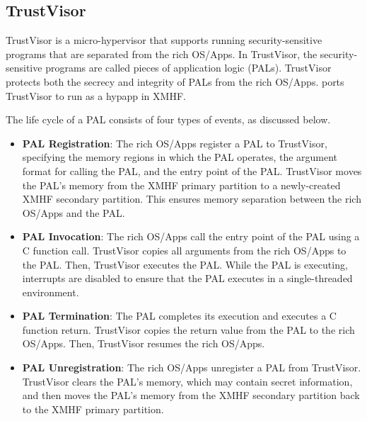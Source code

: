 \subsection{TrustVisor}
\label{sec:bg_tv}

TrustVisor \cite{mccune2010trustvisor} is a micro-hypervisor that supports running security-sensitive programs that are separated from the rich OS/Apps. In TrustVisor, the security-sensitive programs are called pieces of application logic (PALs). TrustVisor protects both the secrecy and integrity of PALs from the rich OS/Apps. \cite{vasudevan2013design} ports TrustVisor to run as a hypapp in XMHF.

The life cycle of a PAL consists of four types of events, as discussed below.

\begin{itemize}
\item \textbf{PAL Registration}: The rich OS/Apps register a PAL to TrustVisor, specifying the memory regions in which the PAL operates, the argument format for calling the PAL, and the entry point of the PAL. TrustVisor moves the PAL's memory from the XMHF primary partition to a newly-created XMHF secondary partition. This ensures memory separation between the rich OS/Apps and the PAL.

\item \textbf{PAL Invocation}: The rich OS/Apps call the entry point of the PAL using a C function call. TrustVisor copies all arguments from the rich OS/Apps to the PAL. Then, TrustVisor executes the PAL. While the PAL is executing, interrupts are disabled to ensure that the PAL executes in a single-threaded environment.

\item \textbf{PAL Termination}: The PAL completes its execution and executes a C function return. TrustVisor copies the return value from the PAL to the rich OS/Apps. Then, TrustVisor resumes the rich OS/Apps.

\item \textbf{PAL Unregistration}: The rich OS/Apps unregister a PAL from TrustVisor. TrustVisor clears the PAL's memory, which may contain secret information, and then moves the PAL's memory from the XMHF secondary partition back to the XMHF primary partition.
\end{itemize}

